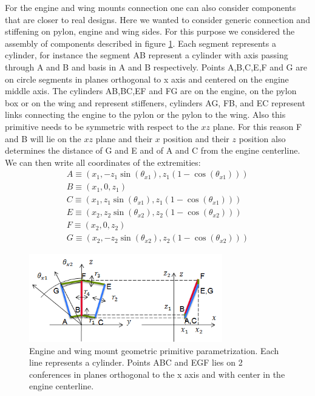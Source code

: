   For the engine and wing mounts connection one can also consider components that are closer to real designs. Here we wanted to consider generic connection and stiffening on pylon, engine and wing sides. For this purpose we considered the assembly of components described in figure \ref{fig:3.42}. Each segment represents a cylinder, for instance the segment AB represent a cylinder with axis passing through A and B and basis in A and B respectively. Points A,B,C,E,F and G are on circle segments in planes orthogonal to x axis and centered on the engine middle axis. The cylinders AB,BC,EF and FG are on the engine, on the pylon box or on the wing and represent stiffeners, cylinders AG, FB, and EC represent links  connecting the engine to the pylon or the pylon to the wing. Also this primitive needs to be symmetric with respect to the $xz$ plane. For this reason F and B will lie on the $xz$ plane and their $x$ position and their $z$ position also determines the distance of G and E and of A and C from the engine centerline. We can then write all coordinates of the extremities:
  \begin{eqnarray}
  A\equiv (x_1,-z_1\sin(\theta_{x1}),z_1(1-\cos(\theta_{x1})))\\
  B\equiv (x_1,0,z_1)\\
  C\equiv (x_1,z_1\sin(\theta_{x1}),z_1(1-\cos(\theta_{x1})))\\
  E\equiv (x_2,z_2\sin(\theta_{x2}),z_2(1-\cos(\theta_{x2})))\\
  F\equiv (x_2,0,z_2)\\
  G\equiv (x_2,-z_2\sin(\theta_{x2}),z_2(1-\cos(\theta_{x2})))
  \end{eqnarray}
   \begin{figure}[!ht]
         \centering
          \includegraphics[width=0.75\textwidth]{images/Ch3/engine_wing_mount_parametrization}
        \caption{Engine and wing mount geometric primitive parametrization. Each line represents a cylinder. Points ABC and EGF lies on 2 conferences in planes orthogonal to the x axis and with center in the engine centerline.}
        \label{fig:3.42}       %
   \end{figure}
